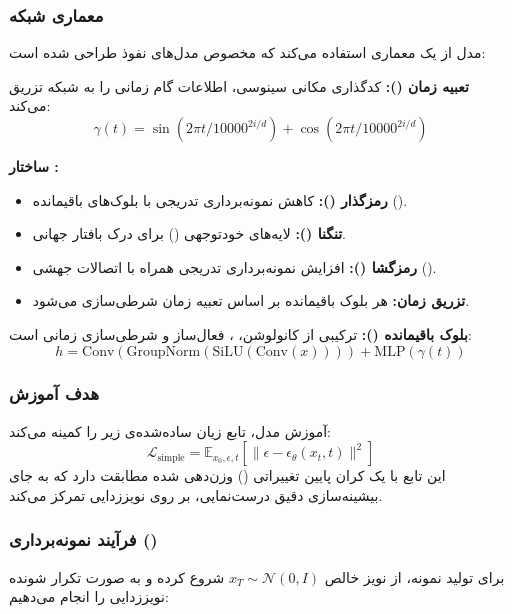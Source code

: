 \subsubsection{معماری شبکه}
مدل  از یک معماری  استفاده می‌کند که مخصوص مدل‌های نفوذ طراحی شده است:



\textbf{تعبیه زمان ():} کدگذاری مکانی سینوسی، اطلاعات گام زمانی را به شبکه تزریق می‌کند:
\[ \gamma(t) = \sin(2\pi t / 10000^{2i/d}) + \cos(2\pi t / 10000^{2i/d}) \]

\textbf{ساختار :}
\begin{itemize}
    \item \textbf{رمزگذار ():} کاهش نمونه‌برداری تدریجی با بلوک‌های باقیمانده ().
    \item \textbf{تنگنا ():} لایه‌های خود‌توجهی () برای درک بافتار جهانی.
    \item \textbf{رمزگشا ():} افزایش نمونه‌برداری تدریجی همراه با اتصالات جهشی ().
    \item \textbf{تزریق زمان:} هر بلوک باقیمانده بر اساس تعبیه زمان شرطی‌سازی می‌شود.
\end{itemize}

\textbf{بلوک باقیمانده ():} ترکیبی از کانولوشن، ، فعال‌ساز  و شرطی‌سازی زمانی است:
\[ h = \text{Conv}(\text{GroupNorm}(\text{SiLU}(\text{Conv}(x)))) + \text{MLP}(\gamma(t)) \]

\subsubsection{هدف آموزش}
آموزش مدل، تابع زیان ساده‌شده‌ی زیر را کمینه می‌کند:
\[ \mathcal{L}_{\text{simple}} = \mathbb{E}_{x_0, \epsilon, t} \left[ \|\epsilon - \epsilon_\theta(x_t, t)\|^2 \right] \]
این تابع با یک کران پایین تغییراتی () وزن‌دهی شده مطابقت دارد که به جای بیشینه‌سازی دقیق درست‌نمایی، بر روی نویززدایی تمرکز می‌کند.


\subsubsection{فرآیند نمونه‌برداری ()}
برای تولید نمونه، از نویز خالص $x_T \sim \mathcal{N}(0, I)$ شروع کرده و به صورت تکرار شونده نویززدایی را انجام می‌دهیم:

